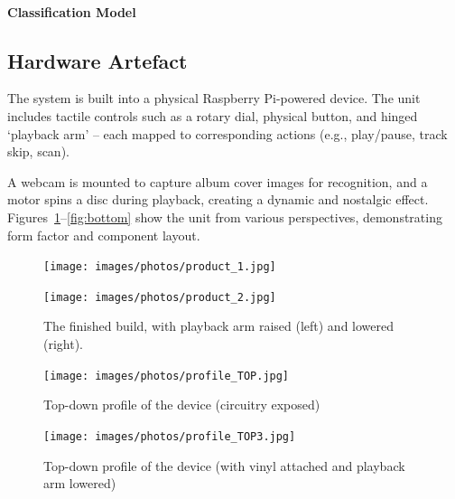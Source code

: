             \paragraph{Classification Model}
        
        \subsection{Hardware Artefact}
    
            The system is built into a physical Raspberry Pi-powered device. The unit includes tactile controls such as a rotary dial, physical button, and hinged `playback arm' -- each mapped to corresponding actions (e.g., play/pause, track skip, scan).
    
            A webcam is mounted to capture album cover images for recognition, and a motor spins a disc during playback, creating a dynamic and nostalgic effect. Figures~\ref{fig:product}–\ref{fig:bottom} show the unit from various perspectives, demonstrating form factor and component layout.
    
            \begin{figure}[H]
                \centering
                \begin{minipage}[b]{0.45\textwidth}
                    \centering
                    \texttt{[image: images/photos/product\_1.jpg]}
                \end{minipage}
                \hfill
                \begin{minipage}[b]{0.45\textwidth}
                    \centering
                    \texttt{[image: images/photos/product\_2.jpg]}
                \end{minipage}
                \caption{The finished build, with playback arm raised (left) and lowered (right).}
                \label{fig:product}
            \end{figure}
    
            \begin{figure}[H]
                \centering
                \begin{minipage}[b]{0.45\textwidth}
                    \centering
                    \texttt{[image: images/photos/profile\_TOP.jpg]}
                    \caption{Top-down profile of the device (circuitry exposed)}
                    \label{fig:top1}
                \end{minipage}
                \hfill
                \begin{minipage}[b]{0.45\textwidth}
                    \centering
                    \texttt{[image: images/photos/profile\_TOP3.jpg]}
                    \caption{Top-down profile of the device (with vinyl attached and  playback arm lowered)}
                    \label{fig:top2}
                \end{minipage}
            \end{figure}
    
